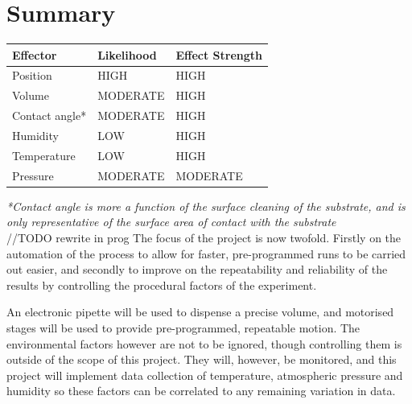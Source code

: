 \section{Summary}
\begin{table}[h]
    \centering
    \begin{tabular}{|l|l|l|}
        \hline
        \textbf{Effector} & \textbf{Likelihood} & \textbf{Effect Strength} \\ \hline
        Position          & HIGH                & HIGH                     \\ \hline
        Volume            & MODERATE            & HIGH                     \\ \hline
        Contact angle*    & MODERATE            & HIGH                     \\ \hline
        Humidity          & LOW                 & HIGH                     \\ \hline
        Temperature       & LOW                 & HIGH                     \\ \hline
        Pressure          & MODERATE            & MODERATE                 \\ \hline
    \end{tabular}
\end{table}
\textit{\small{*Contact angle is more a function of the surface cleaning of the substrate, and is only representative of the surface area of contact with the substrate}} \\

//TODO rewrite in prog
The focus of the project is now twofold. Firstly on the automation of the process to allow for faster, pre-programmed runs to be carried out easier, and secondly to improve on the repeatability and reliability of the results by controlling the procedural factors of the experiment.

An electronic pipette will be used to dispense a precise volume, and motorised stages will be used to provide pre-programmed, repeatable motion. The environmental factors however are not to be ignored, though controlling them is outside of the scope of this project. They will, however, be monitored, and this project will implement data collection of temperature, atmospheric pressure and humidity so these factors can be correlated to any remaining variation in data.
